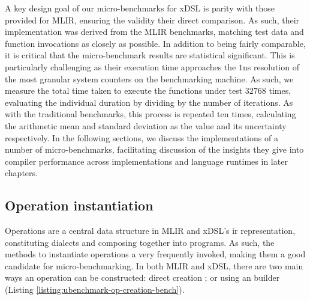 A key design goal of our micro-benchmarks for xDSL is parity with those provided for MLIR, ensuring the validity their direct comparison.
As such, their implementation was derived from the MLIR benchmarks, matching test data and function invocations as closely as possible.
In addition to being fairly comparable, it is critical that the micro-benchmark results are statistical significant. This is particularly challenging as their execution time approaches the $1$ns resolution of the most granular system counters on the benchmarking machine. As such, we measure the total time taken to execute the functions under test $32768$ times, evaluating the individual duration by dividing by the number of iterations. As with the traditional benchmarks, this process is repeated ten times, calculating the arithmetic mean and standard deviation as the value and its uncertainty respectively.
In the following sections, we discuss the implementations of a number of micro-benchmarks, facilitating discussion of the insights they give into compiler performance across implementations and language runtimes in later chapters.


\subsection{Operation instantiation}
\label{ssec:ubenchmark-operation-instantiation}

Operations are a central data structure in MLIR and xDSL's \ac{ir} representation, constituting dialects and composing together into programs.
As such, the methods to instantiate operations a very frequently invoked, making them a good candidate for micro-benchmarking.
In both MLIR and xDSL, there are two main ways an operation can be constructed: direct creation ; or using an builder  (Listing \ref{listing:ubenchmark-op-creation-bench}).

